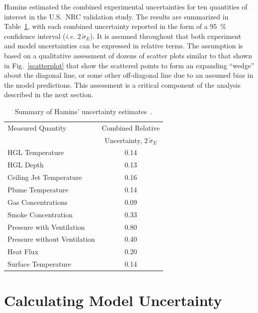 Hamins estimated the combined experimental uncertainties for ten quantities of interest in the U.S.~NRC validation study.
The results are summarized in Table~\ref{Uncertainty}, with
each combined uncertainty reported in the form of a 95~\% confidence interval ({\em i.e.} $2 \, \widetilde{\sigma}_E$).
It is assumed throughout that both experiment and model uncertainties can be expressed in relative terms.
The assumption is based on a
qualitative assessment of dozens of scatter plots similar to that shown in Fig.~\ref{scatterplot} that show
the scattered points to form an expanding ``wedge''
about the diagonal line, or some other off-diagonal line due to an assumed bias in the model predictions.
This assessment is a critical component of the
analysis described in the next section.
\begin{table}[ht]
\caption{Summary of Hamins' uncertainty estimates~\cite{NUREG_1824}. }
\begin{center}
\begin{tabular}{|l|c|}
\hline
Measured Quantity               & Combined Relative       \\
                                & Uncertainty, $2 \, \widetilde{\sigma}_E$       \\ \hline \hline
HGL Temperature                 & 0.14    \\ \hline
HGL Depth                       & 0.13    \\ \hline
Ceiling Jet Temperature         & 0.16    \\ \hline
Plume Temperature               & 0.14    \\ \hline
Gas Concentrations              & 0.09    \\ \hline
Smoke Concentration             & 0.33    \\ \hline
Pressure with Ventilation       & 0.80    \\ \hline
Pressure without Ventilation    & 0.40    \\ \hline
Heat Flux                       & 0.20    \\ \hline
Surface Temperature             & 0.14    \\ \hline
\end{tabular}
\end{center}
\label{Uncertainty}
\end{table}



\section{Calculating Model Uncertainty}

